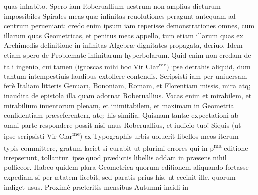\documentclass[11pt,a4paper]{article}
\begin{document}
quas inhabito. Spero iam Roberuallium uestrum non amplius dicturum impossibiles Spirales meas quæ infinitas reuolutiones peragunt antequam ad centrum perueniant: credo enim ipsum iam reperisse demonstrationes omnes, cum illarum quas Geometricas, et penitus meas appello, tum etiam illarum quas ex Archimedis definitione in infinitas Algebræ dignitates propagata, deriuo. Idem etiam spero de Problemate infinitarum hyperbolarum. Quid enim non credam de tali ingenio, cui tamen (ignoscas mihi hoc Vir Clar\textsuperscript{me}) ipse detrahis aliquid, dum tantum intempestiuis laudibus extollere contendis. Scripsisti iam per uniuersam ferè Italiam litteris Genuam, Bononiam, Romam, et Florentiam missis, mira atq; inaudita de epistola illa quam adornat Roberuallius. Vocas enim et mirabilem, et mirabilium inuentorum plenam, et inimitabilem, et maximam in Geometria confidentiam præseferentem, atq; his similia. Quisnam tantæ expectationi ab omni parte respondere possit nisi unus Roberuallius, et iudicio tuo! Siquis (ut ipse scripsisti Vir Clar\textsuperscript{me}) ex Typographis urbis uoluerit libellos meos iterum typis committere, gratum faciet si curabit ut plurimi errores qui in p\textsuperscript{ma} editione irrepserunt, tollantur. ipse quod prædictis libellis addam in præsens nihil polliceor. Habeo quidem plura Geometrica quorum editionem aliquando fortasse expediam si per ætatem licebit, sed paratis prius his, ut cecinit ille, quorum indiget usus. Proximè præteritis mensibus Autumni incidi in 

\end{document}
